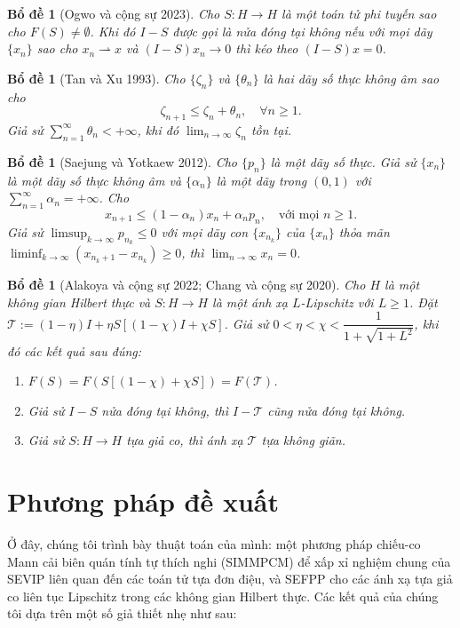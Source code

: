 \documentclass[11pt,a4paper]{article}
\theoremstyle{plain}
\newtheorem{lemma}[theorem]{Bổ đề}
\theoremstyle{definition}
\theoremstyle{remark}
\numberwithin{equation}{section}
\newcommand{\wto}{\rightharpoonup}
\newcommand{\Fix}[1]{F(#1)}
\begin{document}
\begin{lemma}[Ogwo và cộng sự 2023]\label{lem:2.8}
Cho $S:H\to H$ là một toán tử phi tuyến sao cho $\Fix{S}\ne\emptyset$. Khi đó $I-S$ được gọi là \textit{nửa đóng tại không} nếu với mọi dãy $\{x_n\}$ sao cho $x_n\wto x$ và $(I-S)x_n\to 0$ thì kéo theo $(I-S)x=0$.
\end{lemma}

\begin{lemma}[Tan và Xu 1993]\label{lem:2.9}
Cho $\{\zeta_n\}$ và $\{\theta_n\}$ là hai dãy số thực không âm sao cho
\[
\zeta_{n+1}\le\zeta_n+\theta_n,\quad\forall n\ge 1.
\]
Giả sử $\sum_{n=1}^{\infty}\theta_n<+\infty$, khi đó $\lim_{n\to\infty}\zeta_n$ tồn tại.
\end{lemma}

\begin{lemma}[Saejung và Yotkaew 2012]\label{lem:2.10}
Cho $\{p_n\}$ là một dãy số thực. Giả sử $\{x_n\}$ là một dãy số thực không âm và $\{\alpha_n\}$ là một dãy trong $(0,1)$ với $\sum_{n=1}^{\infty}\alpha_n=+\infty$. Cho
\[
x_{n+1}\le(1-\alpha_n)x_n+\alpha_n p_n,\quad\text{với mọi } n\ge 1.
\]
Giả sử $\limsup_{k\to\infty}p_{n_k}\le 0$ với mọi dãy con $\{x_{n_k}\}$ của $\{x_n\}$ thỏa mãn $\liminf_{k\to\infty}(x_{n_k+1}-x_{n_k})\ge 0$, thì $\lim_{n\to\infty}x_n=0$.
\end{lemma}

\begin{lemma}[Alakoya và cộng sự 2022; Chang và cộng sự 2020]\label{lem:2.11}
Cho $H$ là một không gian Hilbert thực và $S:H\to H$ là một ánh xạ $L$-Lipschitz với $L\ge 1$. Đặt $\mathcal{T}:=(1-\eta)I+\eta S[(1-\chi)I+\chi S]$. Giả sử $0<\eta<\chi<\dfrac{1}{1+\sqrt{1+L^2}}$, khi đó các kết quả sau đúng:
\begin{enumerate}[label=(\roman*)]
\item $\Fix{S}=F(S[(1-\chi)+\chi S])=F(\mathcal{T})$.
\item Giả sử $I-S$ nửa đóng tại không, thì $I-\mathcal{T}$ cũng nửa đóng tại không.
\item Giả sử $S:H\to H$ tựa giả co, thì ánh xạ $\mathcal{T}$ tựa không giãn.
\end{enumerate}
\end{lemma}

\section{Phương pháp đề xuất}\label{sec:method}

Ở đây, chúng tôi trình bày thuật toán của mình: một phương pháp chiếu-co Mann cải biên quán tính tự thích nghi (SIMMPCM) để xấp xỉ nghiệm chung của SEVIP liên quan đến các toán tử tựa đơn điệu, và SEFPP cho các ánh xạ tựa giả co liên tục Lipschitz trong các không gian Hilbert thực. Các kết quả của chúng tôi dựa trên một số giả thiết nhẹ như sau:
\end{document}

